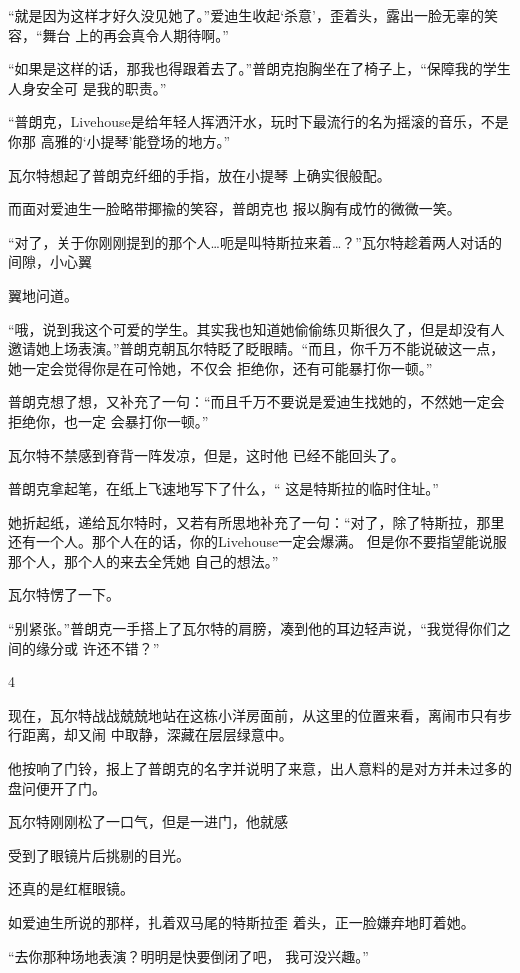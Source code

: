 \documentclass{article}
\begin{document}
“就是因为这样才好久没见她了。”爱迪生收起‘杀意’，歪着头，露出一脸无辜的笑容，“舞台
上的再会真令人期待啊。” 

“如果是这样的话，那我也得跟着去了。”普朗克抱胸坐在了椅子上，“保障我的学生人身安全可
是我的职责。” 

“普朗克，Livehouse是给年轻人挥洒汗水，玩时下最流行的名为摇滚的音乐，不是你那
高雅的‘小提琴’能登场的地方。” 

瓦尔特想起了普朗克纤细的手指，放在小提琴
上确实很般配。 

而面对爱迪生一脸略带揶揄的笑容，普朗克也
报以胸有成竹的微微一笑。 

“对了，关于你刚刚提到的那个人…呃是叫特斯拉来着…？”瓦尔特趁着两人对话的间隙，小心翼
\newpage

翼地问道。 

“哦，说到我这个可爱的学生。其实我也知道她偷偷练贝斯很久了，但是却没有人邀请她上场表演。”普朗克朝瓦尔特眨了眨眼睛。“而且，你千万不能说破这一点，她一定会觉得你是在可怜她，不仅会
拒绝你，还有可能暴打你一顿。” 

普朗克想了想，又补充了一句：“而且千万不要说是爱迪生找她的，不然她一定会拒绝你，也一定
会暴打你一顿。” 

瓦尔特不禁感到脊背一阵发凉，但是，这时他
已经不能回头了。 

普朗克拿起笔，在纸上飞速地写下了什么，“
这是特斯拉的临时住址。” 

她折起纸，递给瓦尔特时，又若有所思地补充了一句：“对了，除了特斯拉，那里还有一个人。那个人在的话，你的Livehouse一定会爆满。
\newpage
但是你不要指望能说服那个人，那个人的来去全凭她
自己的想法。” 


瓦尔特愣了一下。 

“别紧张。”普朗克一手搭上了瓦尔特的肩膀，凑到他的耳边轻声说，“我觉得你们之间的缘分或
许还不错？” 


4 

现在，瓦尔特战战兢兢地站在这栋小洋房面前，从这里的位置来看，离闹市只有步行距离，却又闹
中取静，深藏在层层绿意中。 

他按响了门铃，报上了普朗克的名字并说明了来意，出人意料的是对方并未过多的盘问便开了门。
 

瓦尔特刚刚松了一口气，但是一进门，他就感

\newpage
受到了眼镜片后挑剔的目光。 


还真的是红框眼镜。 

如爱迪生所说的那样，扎着双马尾的特斯拉歪
着头，正一脸嫌弃地盯着她。 

“去你那种场地表演？明明是快要倒闭了吧，
我可没兴趣。” 
\end{document}
